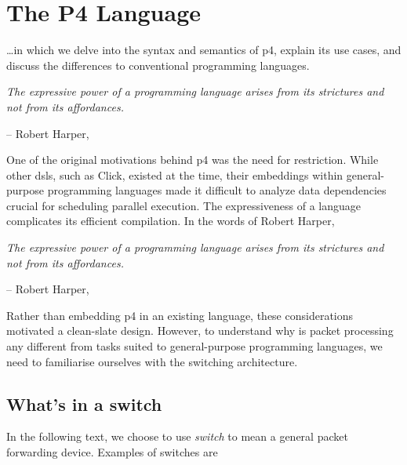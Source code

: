 
\chapter{The P4 Language}

\begin{chapterabstract}
	\dots in which we delve into the syntax and semantics of \acrshort{p4},
	explain its use cases, and discuss the differences to conventional programming
	languages.

	\begin{displayquote}
		\textit{The expressive power of a programming language arises from its
		strictures and \emph{not} from its affordances.}

		-- Robert Harper,  \cite{pfpl1oplss2019}
	\end{displayquote}
\end{chapterabstract}

One of the original motivations behind \acrshort{p4} was the need for
restriction. While other \acrlong{dsl}s, such as Click\cite{kohler2000click},
existed at the time, their embeddings within general-purpose programming
languages made it difficult to analyze data dependencies crucial for scheduling
parallel execution. The expressiveness of a language complicates its efficient
compilation. In the words of Robert Harper,

\begin{displayquote}
	\textit{The expressive power of a programming language arises from its
	strictures and \emph{not} from its affordances.}

	-- Robert Harper,  \cite{pfpl1oplss2019}
\end{displayquote}

Rather than embedding \acrshort{p4} in an existing language, these
considerations motivated a clean-slate design. However, to understand why is
packet processing any different from tasks suited to general-purpose programming
languages, we need to familiarise ourselves with the switching architecture.

\section{What's in a switch}

In the following text, we choose to use \emph{switch} to mean a general packet
forwarding device. Examples of switches are

